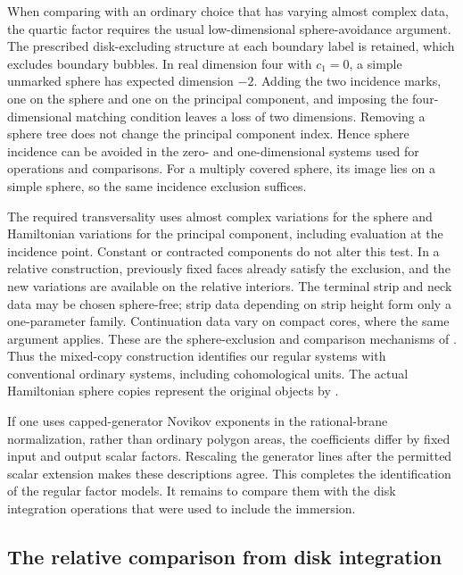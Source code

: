 When comparing with an ordinary choice that has varying almost
complex data, the quartic factor requires the usual low-dimensional
sphere-avoidance argument.  The prescribed disk-excluding structure
at each boundary label is retained, which excludes boundary bubbles.
In real dimension four with $c_1=0$, a simple unmarked sphere has
expected dimension $-2$.  Adding the two incidence marks, one on
the sphere and one on the principal component, and imposing the
four-dimensional matching condition leaves a loss of two dimensions.
Removing a sphere tree does not change the principal component
index.  Hence sphere incidence can be avoided in the zero- and
one-dimensional systems used for operations and comparisons.  For
a multiply covered sphere, its image lies on a simple sphere, so the
same incidence exclusion suffices.

The required transversality uses almost complex variations for the
sphere and Hamiltonian variations for the principal component,
including evaluation at the incidence point.  Constant or contracted
components do not alter this test.  In a relative construction,
previously fixed faces already satisfy the exclusion, and the new
variations are available on the relative interiors.  The terminal
strip and neck data may be chosen sphere-free; strip data depending
on strip height form only a one-parameter family.  Continuation data
vary on compact cores, where the same argument applies.  These are
the sphere-exclusion and comparison mechanisms of
\cite[Section~8]{SeidelQuartic}.  Thus the mixed-copy construction
identifies our regular systems with conventional ordinary systems,
including cohomological units.  The actual Hamiltonian sphere copies
represent the original objects by
\cite[Lemma~8.14]{SeidelQuartic}.

If one uses capped-generator Novikov exponents in the rational-brane
normalization, rather than ordinary polygon areas, the coefficients
differ by fixed input and output scalar factors.  Rescaling the
generator lines after the permitted scalar extension makes these
descriptions agree.  This completes the identification of the
regular factor models.  It remains to compare them with the disk
integration operations that were used to include the immersion.

\subsection{The relative comparison from disk integration}
\label{comp:virtual}

